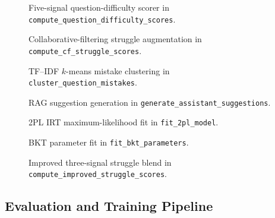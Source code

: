 \begin{figure}[H]

\caption{Five-signal question-difficulty scorer in \texttt{compute\_question\_difficulty\_scores}.}
\label{fig:appx-difficulty}
\end{figure}

\begin{figure}[H]

\caption{Collaborative-filtering struggle augmentation in \texttt{compute\_cf\_struggle\_scores}.}
\label{fig:appx-cf}
\end{figure}

\begin{figure}[H]

\caption{TF--IDF $k$-means mistake clustering in \texttt{cluster\_question\_mistakes}.}
\label{fig:appx-cluster}
\end{figure}

\begin{figure}[H]

\caption{RAG suggestion generation in \texttt{generate\_assistant\_suggestions}.}
\label{fig:appx-rag}
\end{figure}

\begin{figure}[H]

\caption{2PL IRT maximum-likelihood fit in \texttt{fit\_2pl\_model}.}
\label{fig:appx-irt}
\end{figure}

\begin{figure}[H]

\caption{BKT parameter fit in \texttt{fit\_bkt\_parameters}.}
\label{fig:appx-bkt}
\end{figure}

\begin{figure}[H]

\caption{Improved three-signal struggle blend in \texttt{compute\_improved\_struggle\_scores}.}
\label{fig:appx-improved}
\end{figure}

\subsection{Evaluation and Training Pipeline}

